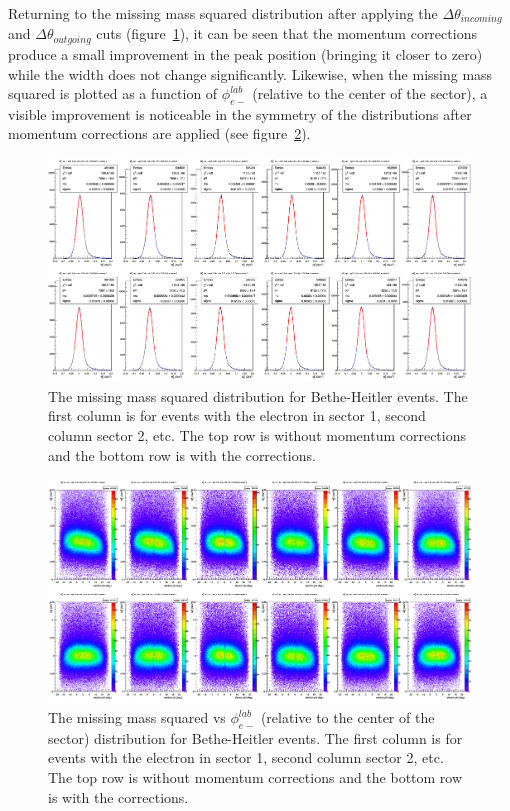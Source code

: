 Returning to the missing mass squared distribution after applying the $\Delta\theta_{incoming}$ and $\Delta\theta_{outgoing}$ cuts (figure~\ref{fig:MX2_BHevents}), it can be seen that the momentum corrections produce a small improvement in the peak position (bringing it closer to zero) while the width does not change significantly.
Likewise, when the missing mass squared is plotted as a function of $\phi_{e-}^{lab}$ (relative to the center of the sector), a visible improvement is noticeable in the symmetry of the distributions after momentum corrections are applied (see figure~\ref{fig:MX2Vphi_BHevents}).
%
\begin{figure}
\centering
\includegraphics[width=8.5in]{figures/MX2_BHevents.png}
\caption{The missing mass squared distribution for Bethe-Heitler events. The first column is for events with the electron in sector 1, second column sector 2, etc. The top row is without momentum corrections and the bottom row is with the corrections.}
\label{fig:MX2_BHevents}
\end{figure}
%
\begin{figure}
\centering
\includegraphics[width=8.5in]{figures/MX2Vphi_BHevents.png}
\caption{The missing mass squared vs $\phi_{e-}^{lab}$ (relative to the center of the sector) distribution for Bethe-Heitler events. The first column is for events with the electron in sector 1, second column sector 2, etc. The top row is without momentum corrections and the bottom row is with the corrections.}
\label{fig:MX2Vphi_BHevents}
\end{figure}
%

